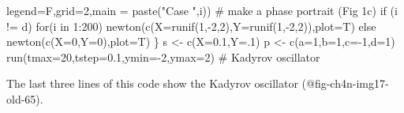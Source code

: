 \documentclass[
  a4paper,
  DIV=11,
  numbers=noendperiod,
  oneside]{scrreprt}
\newenvironment{Shaded}{\begin{snugshade}}{\end{snugshade}}
\newcommand{\AttributeTok}[1]{\textcolor[rgb]{0.40,0.45,0.13}{#1}}
\newcommand{\CommentTok}[1]{\textcolor[rgb]{0.37,0.37,0.37}{#1}}
\newcommand{\ControlFlowTok}[1]{\textcolor[rgb]{0.00,0.23,0.31}{#1}}
\newcommand{\DecValTok}[1]{\textcolor[rgb]{0.68,0.00,0.00}{#1}}
\newcommand{\FloatTok}[1]{\textcolor[rgb]{0.68,0.00,0.00}{#1}}
\newcommand{\FunctionTok}[1]{\textcolor[rgb]{0.28,0.35,0.67}{#1}}
\newcommand{\NormalTok}[1]{\textcolor[rgb]{0.00,0.23,0.31}{#1}}
\newcommand{\OtherTok}[1]{\textcolor[rgb]{0.00,0.23,0.31}{#1}}
\newcommand{\SpecialCharTok}[1]{\textcolor[rgb]{0.37,0.37,0.37}{#1}}
\newcommand{\StringTok}[1]{\textcolor[rgb]{0.13,0.47,0.30}{#1}}
\begin{document}
\begin{Shaded}
\begin{Highlighting}[]
        \AttributeTok{legend=}\NormalTok{F,}\AttributeTok{grid=}\DecValTok{2}\NormalTok{,}\AttributeTok{main =} \FunctionTok{paste}\NormalTok{(}\StringTok{"Case "}\NormalTok{,i)) }\CommentTok{\# make a phase portrait (Fig 1c)}
  \ControlFlowTok{if}\NormalTok{ (i }\SpecialCharTok{!=} \StringTok{\textquotesingle{}d\textquotesingle{}}\NormalTok{) }\ControlFlowTok{for}\NormalTok{(i }\ControlFlowTok{in} \DecValTok{1}\SpecialCharTok{:}\DecValTok{200}\NormalTok{) }\FunctionTok{newton}\NormalTok{(}\FunctionTok{c}\NormalTok{(}\AttributeTok{X=}\FunctionTok{runif}\NormalTok{(}\DecValTok{1}\NormalTok{,}\SpecialCharTok{{-}}\DecValTok{2}\NormalTok{,}\DecValTok{2}\NormalTok{),}\AttributeTok{Y=}\FunctionTok{runif}\NormalTok{(}\DecValTok{1}\NormalTok{,}\SpecialCharTok{{-}}\DecValTok{2}\NormalTok{,}\DecValTok{2}\NormalTok{)),}\AttributeTok{plot=}\NormalTok{T) }\ControlFlowTok{else}
    \FunctionTok{newton}\NormalTok{(}\FunctionTok{c}\NormalTok{(}\AttributeTok{X=}\DecValTok{0}\NormalTok{,}\AttributeTok{Y=}\DecValTok{0}\NormalTok{),}\AttributeTok{plot=}\NormalTok{T)}
\NormalTok{\}}
\NormalTok{s }\OtherTok{\textless{}{-}} \FunctionTok{c}\NormalTok{(}\AttributeTok{X=}\FloatTok{0.1}\NormalTok{,}\AttributeTok{Y=}\NormalTok{.}\DecValTok{1}\NormalTok{) }
\NormalTok{p }\OtherTok{\textless{}{-}} \FunctionTok{c}\NormalTok{(}\AttributeTok{a=}\DecValTok{1}\NormalTok{,}\AttributeTok{b=}\DecValTok{1}\NormalTok{,}\AttributeTok{c=}\SpecialCharTok{{-}}\DecValTok{1}\NormalTok{,}\AttributeTok{d=}\DecValTok{1}\NormalTok{)}
\FunctionTok{run}\NormalTok{(}\AttributeTok{tmax=}\DecValTok{20}\NormalTok{,}\AttributeTok{tstep=}\FloatTok{0.1}\NormalTok{,}\AttributeTok{ymin=}\SpecialCharTok{{-}}\DecValTok{2}\NormalTok{,}\AttributeTok{ymax=}\DecValTok{2}\NormalTok{) }\CommentTok{\# Kadyrov oscillator}
\end{Highlighting}
\end{Shaded}

The last three lines of this code show the Kadyrov oscillator
(@fig-ch4n-img17-old-65).
\end{document}
